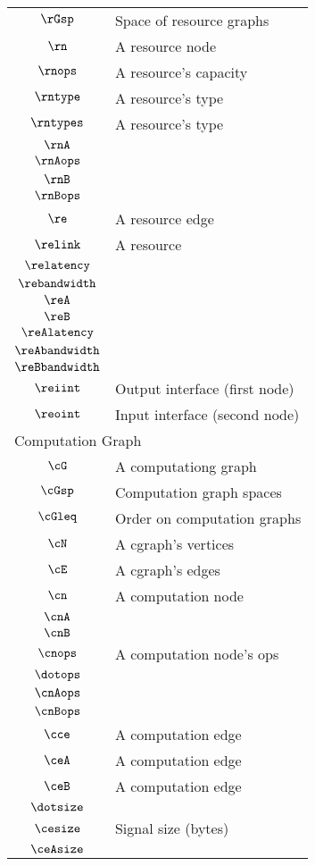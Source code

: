 \begin{longtable}{cl}
 $\rGsp$ &  Space of resource graphs\\ 
 $\rn$ &  A resource node\\ 
 $\rnops$ &  A resource's capacity\\ 
 $\rntype$ &  A resource's type\\ 
 $\rntypes$ &  A resource's type\\ 
 $\rnA$ & \\ 
 $\rnAops$ & \\ 
 $\rnB$ & \\ 
 $\rnBops$ & \\ 
 $\re$ &  A resource edge\\ 
 $\relink$ &  A resource \\ 
 $\relatency$ & \\ 
 $\rebandwidth$ & \\ 
 $\reA$ & \\ 
 $\reB$ & \\ 
 $\reAlatency$ & \\ 
 $\reAbandwidth$ & \\ 
 $\reBbandwidth$ & \\ 
 $\reiint$ &  Output interface (first node)\\ 
 $\reoint$ &  Input interface (second node)\\ 
 \multicolumn{2}{l}{Computation Graph}\\ 
 \hline
$\cG$ &  A computationg graph\\ 
 $\cGsp$ &  Computation graph spaces\\ 
 $\cGleq$ &  Order on computation graphs\\ 
 $\cN$ &  A cgraph's vertices\\ 
 $\cE$ &  A cgraph's edges\\ 
 $\cn$ &  A computation node\\ 
 $\cnA$ & \\ 
 $\cnB$ & \\ 
 $\cnops$ &  A computation node's ops\\ 
 $\dotops$ & \\ 
 $\cnAops$ & \\ 
 $\cnBops$ & \\ 
 $\cce$ &  A computation edge\\ 
 $\ceA$ &  A computation edge\\ 
 $\ceB$ &  A computation edge\\ 
 $\dotsize$ & \\ 
 $\cesize$ &  Signal size (bytes)\\ 
 $\ceAsize$ & \\ 

\end{longtable}
